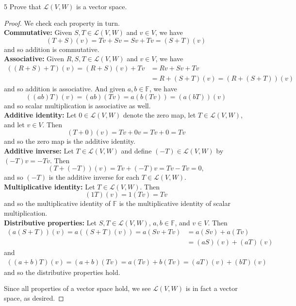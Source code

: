 \documentclass[11pt]{extarticle}
\newenvironment{problem}[1]{\begin{prob*}{#1}{}}{\end{prob*}}
\newcommand{\F}{\mathbb{F}}
\newcommand{\Hom}{\mathcal{L}}
\begin{document}
\begin{problem}{5}
Prove that $\Hom(V,W)$ is a vector space.
\end{problem}
\begin{proof}
We check each property in turn.\\
\textbf{Commutative:}  Given $S,T\in\Hom(V,W)$ and $v\in V$, we have 
\begin{equation*}
(T+S)(v) = Tv + Sv = Sv + Tv = (S + T)(v)
\end{equation*} 
and so addition is commutative.\\
\textbf{Associative:} Given $R,S,T\in\Hom(V,W)$ and $v\in V$, we have 
\begin{align*}
((R + S) + T)(v) = (R+S)(v) + Tv &= Rv + Sv + Tv\\
&= R + (S + T)(v) = (R + (S + T))(v)
\end{align*}
and so addition is associative.  And given $a,b\in\F$, we have
\begin{equation*}
((ab)T)(v) = (ab)(Tv) = a(b(Tv)) = (a(bT))(v)
\end{equation*}
and so scalar multiplication is associative as well.\\
\textbf{Additive identity:} Let $0\in\Hom(V,W)$ denote the zero map, let $T\in\Hom(V,W)$, and let $v\in V$.  Then 
\begin{equation*}
(T + 0)(v) = Tv + 0v = Tv + 0 = Tv
\end{equation*}
and so the zero map is the additive identity.\\
\textbf{Additive inverse:} Let $T\in\Hom(V,W)$ and define $(-T)\in\Hom(V,W)$ by $(-T)v = -Tv$.  Then
\begin{equation*}
(T + (-T))(v) = Tv + (-T)v = Tv - Tv = 0,
\end{equation*}
and so $(-T)$ is the additive inverse for each $T\in\Hom(V,W)$.\\
\textbf{Multiplicative identity:}  Let $T\in\Hom(V,W)$.  Then
\begin{equation*}
(1T)(v) = 1(Tv) = Tv
\end{equation*}
and so the multiplicative identity of $\F$ is the multiplicative identity of scalar multiplication.\\
\textbf{Distributive properties:}  Let $S,T\in\Hom(V,W)$, $a,b\in\F$, and $v\in V$.  Then 
\begin{align*}
(a(S + T))(v) = a((S + T)(v)) = a(Sv + Tv) &= a(Sv) + a(Tv)\\
 & = (aS)(v) + (aT)(v)
\end{align*}
and
\begin{align*}
((a + b)T)(v) = (a+b)(Tv) = a(Tv) + b(Tv) = (aT)(v) + (bT)(v)
\end{align*}
and so the distributive properties hold.
\par Since all properties of a vector space hold, we see $\Hom(V,W)$ is in fact a vector space, as desired.
\end{proof}
\end{document}
